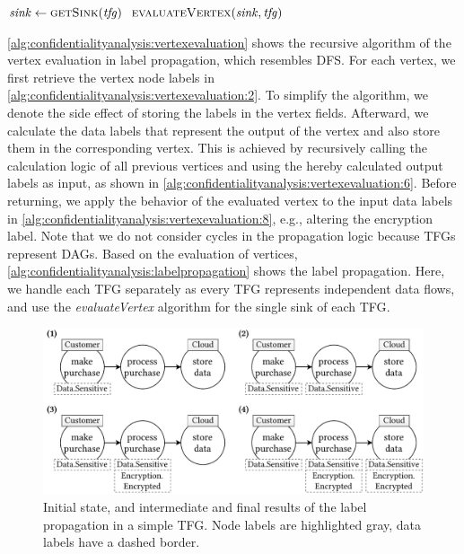 \begin{algorithm}
    \caption{Algorithm for label propagation in \acfp*{TFG}}
    \label{alg:confidentialityanalysis:labelpropagation}
    \begin{algorithmic}[1]
            \algindentskip

             
                \State $\mathit{sink} \gets \textsc{getSink}(\mathit{tfg})$ 
                \State $\textsc{evaluateVertex}(\mathit{sink}, \mathit{tfg})$
            \EndFor
            \algblockskip

            \State {}
            \algindentskip
        \EndProcedure   
    \end{algorithmic}
\end{algorithm}

\autoref{alg:confidentialityanalysis:vertexevaluation} shows the recursive algorithm of the vertex evaluation in label propagation, which resembles \ac{DFS}.
For each vertex, we first retrieve the vertex node labels in \autoref{alg:confidentialityanalysis:vertexevaluation:2}.
To simplify the algorithm, we denote the side effect of storing the labels in the vertex fields.
Afterward, we calculate the data labels that represent the output of the vertex and also store them in the corresponding vertex. 
This is achieved by recursively calling the calculation logic of all previous vertices and using the hereby calculated output labels as input, as shown in \autoref{alg:confidentialityanalysis:vertexevaluation:6}.
Before returning, we apply the behavior of the evaluated vertex to the input data labels in \autoref{alg:confidentialityanalysis:vertexevaluation:8}, e.g., altering the encryption label.
Note that we do not consider cycles in the propagation logic because \acp{TFG} represent \acp{DAG}.
Based on the evaluation of vertices, \autoref{alg:confidentialityanalysis:labelpropagation} shows the label propagation.
Here, we handle each \ac{TFG} separately as every \ac{TFG} represents independent data flows, and use the \emph{evaluateVertex} algorithm for the single sink of each \ac{TFG}.

\begin{figure}
    \centering
    \includegraphics[width=\linewidth]{figures/chapter7/labelpropagation.pdf}
    \caption{Initial state, and intermediate and final results of the label propagation in a simple \acf*{TFG}. Node labels are highlighted gray, data labels have a dashed border.}
    \label{fig:confidentialityanalysis:labelpropagation}
\end{figure}

